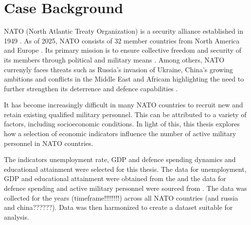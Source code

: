 \chapter{Case Background}

NATO (North Atlantic Treaty Organization) is a security
alliance established in 1949 \parencite{noauthor_about_NATO_nodate}. As of 2025, NATO
consists of 32 member countries from North America and Europe \parencite{noauthor_member_countries_nodate}.
Its primary mission is to ensure collective freedom and security of its members through 
political and military means \parencite{noauthor_about_NATO_nodate}. Among others, NATO currenyly faces 
threats such as  Russia's invasion of Ukraine, China's growing ambitions and conflicts 
in the Middle East and Africam highlighting the need to further strengthen its deterrence 
and defence capabilities \parencite{noauthor_strategic_concept_nodate}.

It has become increasingly difficult in many NATO countries to recruit new 
and retain existing qualified military personnel. This can be attributed to 
a variety of factors, including socioeconomic conditions. \parencite{nato_research_and_technology_organization_recruiting_2007}
In light of this, this thesis explores how a selection of economic indicators 
influence the number of active military personnel in NATO countries.

The indicators unemployment rate, GDP and defence spending dynamics and educational 
attainment were selected for this thesis. The data for unemployment, GDP and educational 
attainment were obtained from the \textcite{noauthor_world_bank_nodate} and the data for defence spending 
and active military personnel were sourced from \textcite{noauthor_military_balance_nodate}. The data 
was collected for the years (timeframe!!!!!!!!) across all NATO countries (and russia and china??????). 
Data was then harmonized to create a dataset suitable for analysis.
